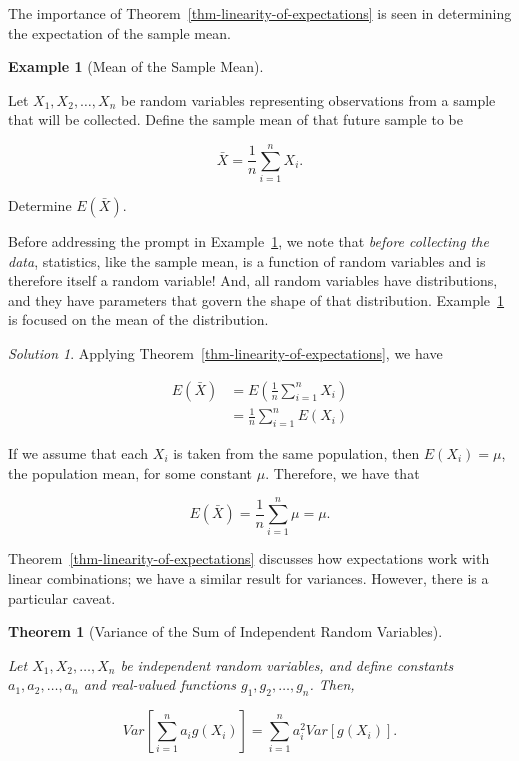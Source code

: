 \documentclass[
  letterpaper,
  DIV=11,
  numbers=noendperiod]{scrreprt}
\theoremstyle{plain}
\newtheorem{theorem}{Theorem}[chapter]
\theoremstyle{definition}
\theoremstyle{definition}
\newtheorem{example}{Example}[chapter]
\theoremstyle{remark}
\newtheorem*{solution}{Solution}
\begin{document}
The importance of Theorem~\ref{thm-linearity-of-expectations} is seen in
determining the expectation of the sample mean.

\begin{example}[Mean of the Sample
Mean]\protect\hypertarget{exm-mean-xbar}{}\label{exm-mean-xbar}

Let \(X_1, X_2, \dotsc, X_n\) be random variables representing
observations from a sample that will be collected. Define the sample
mean of that future sample to be

\[\bar{X} = \frac{1}{n} \sum_{i=1}^{n} X_i.\]

Determine \(E\left(\bar{X}\right)\).

\end{example}

Before addressing the prompt in Example~\ref{exm-mean-xbar}, we note
that \emph{before collecting the data}, statistics, like the sample
mean, is a function of random variables and is therefore itself a random
variable! And, all random variables have distributions, and they have
parameters that govern the shape of that distribution.
Example~\ref{exm-mean-xbar} is focused on the mean of the distribution.

\begin{solution}

Applying Theorem~\ref{thm-linearity-of-expectations}, we have

\[
\begin{aligned}
  E\left(\bar{X}\right)
    &= E\left(\frac{1}{n} \sum_{i=1}^{n} X_i\right) \\
    &= \frac{1}{n} \sum_{i=1}^{n} E\left(X_i\right)
\end{aligned}
\]

If we assume that each \(X_i\) is taken from the same population, then
\(E\left(X_i\right) = \mu\), the population mean, for some constant
\(\mu\). Therefore, we have that

\[E\left(\bar{X}\right) = \frac{1}{n} \sum_{i=1}^{n} \mu = \mu.\]

\end{solution}

Theorem~\ref{thm-linearity-of-expectations} discusses how expectations
work with linear combinations; we have a similar result for variances.
However, there is a particular caveat.

\begin{theorem}[Variance of the Sum of Independent Random
Variables]\protect\hypertarget{thm-variance-independent-sum}{}\label{thm-variance-independent-sum}

Let \(X_1, X_2, \dotsc, X_n\) be independent random variables, and
define constants \(a_1, a_2, \dotsc, a_n\) and real-valued functions
\(g_1, g_2, \dotsc, g_n\). Then,

\[Var\left[\sum_{i=1}^{n} a_i g\left(X_i\right)\right] = \sum_{i=1}^{n} a^2_i Var\left[g\left(X_i\right)\right].\]

\end{theorem}
\end{document}
